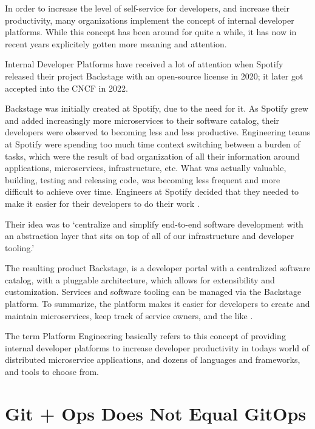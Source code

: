 In order to increase the level of self-service for developers,
and increase their productivity,
many organizations implement the concept of internal developer platforms.
While this concept has been around for quite a while,
it has now in recent years explicitely gotten more meaning and attention.

Internal Developer Platforms have received a lot of attention
when Spotify released their project Backstage
\autocite{backstageIOWebsite}
with an open-source license in 2020; it later got accepted into the CNCF in 2022.

%
Backstage was initially created at Spotify, due to the need for it.
As Spotify grew and added increasingly more microservices to their software catalog,
their developers were observed to becoming less and less productive.
Engineering teams at Spotify were spending too much time context switching between
a burden of tasks, which were the result of bad organization of all their
information around applications, microservices, infrastructure, etc.
What was actually valuable, building, testing and releasing code,
was becoming less frequent and more difficult to achieve over time.
Engineers at Spotify decided that they needed to make it easier 
for their developers to do their work
\autocite{backstageSpotifyStory}.

Their idea was to
\enquote*{centralize and simplify end-to-end software development
with an abstraction layer that sits on top of all of our infrastructure and developer tooling.}
\autocite{backstageSpotifyStory}

The resulting product Backstage,
is a developer portal with a centralized software catalog,
with a pluggable architecture,
which allows for extensibility and customization.
Services and software tooling can be managed via the Backstage platform.
To summarize, the platform makes it easier for developers to create and maintain
microservices, keep track of service owners, and the like
\autocite{backstageSpotifyStory}.

The term Platform Engineering basically refers to this concept of
providing internal developer platforms to increase developer productivity
in todays world of distributed microservice applications,
and dozens of languages and frameworks,
and tools to choose from.






\section{Git + Ops Does Not Equal GitOps}

